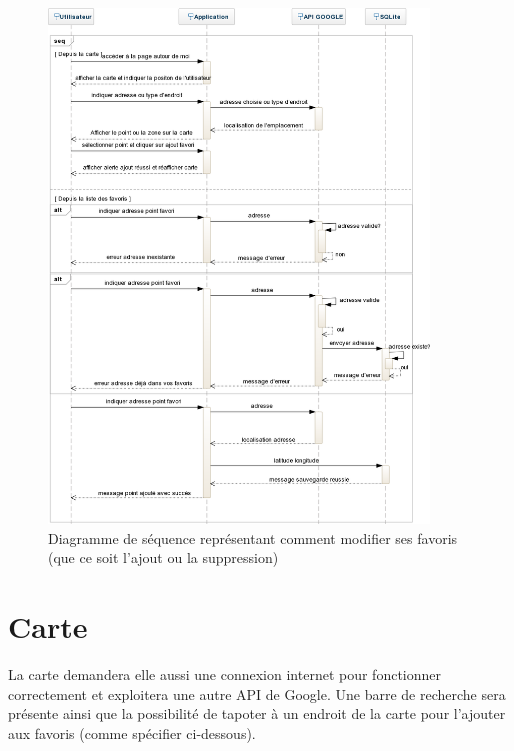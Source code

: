 \documentclass[a4paper, 12pt, notitlepage]{article} %
\begin{document}
\vfill
\begin{figure}[!htb]
    \centering
    \includegraphics[width=0.9\textwidth]{Sequence_Favoris.png}
    \caption[Diagramme de séquence d'utilisation des favoris]{Diagramme de séquence représentant comment modifier ses favoris (que ce soit l'ajout ou la suppression)}
    \label{fig:Favoris}
\end{figure}
\vfill
\clearpage

\section{Carte}
La carte demandera elle aussi une connexion internet pour fonctionner correctement et exploitera une autre API de Google.
Une barre de recherche sera présente ainsi que la possibilité de tapoter à un endroit de la carte pour l'ajouter aux favoris (comme spécifier ci-dessous).  
\end{document}
